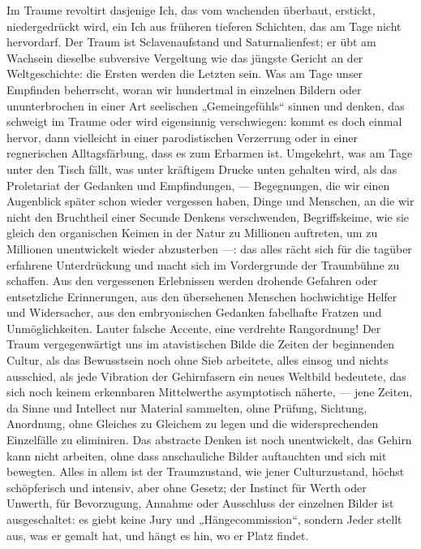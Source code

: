Im Traume revoltirt dasjenige Ich, das vom wachenden überbaut, erstickt, niedergedrückt wird, ein Ich aus früheren tieferen Schichten, das am Tage nicht hervordarf. Der Traum ist Sclavenaufstand und Saturnalienfest; er übt am Wachsein dieselbe subversive Vergeltung wie das jüngste Gericht an der Weltgeschichte: die Ersten werden die Letzten sein. Was am Tage unser Empfinden beherrscht, woran wir hundertmal in einzelnen Bildern oder ununterbrochen in einer Art seelischen „Gemeingefühls“ sinnen und denken, das schweigt im Traume oder wird eigensinnig verschwiegen: kommt es doch einmal hervor, dann vielleicht in einer parodistischen Verzerrung oder in einer regnerischen Alltagsfärbung, dass es zum Erbarmen ist. Umgekehrt, was am Tage unter den Tisch fällt, was unter kräftigem Drucke unten gehalten wird, als das Proletariat der Gedanken und Empfindungen, — Begegnungen, die wir einen Augenblick später schon wieder vergessen haben, Dinge und Menschen, an die wir nicht den Bruchtheil einer Secunde Denkens verschwenden, Begriffskeime, wie sie gleich den organischen Keimen in der Natur zu Millionen auftreten, um zu Millionen unentwickelt wieder abzusterben —: das alles rächt sich für die tagüber erfahrene Unterdrückung und macht sich im Vordergrunde der Traumbühne zu schaffen. Aus den vergessenen Erlebnissen werden drohende Gefahren oder entsetzliche Erinnerungen, aus den übersehenen Menschen hochwichtige Helfer und Widersacher, aus den embryonischen Gedanken fabelhafte Fratzen und Unmöglichkeiten. Lauter falsche Accente, eine verdrehte Rangordnung! Der Traum vergegenwärtigt uns im atavistischen Bilde die Zeiten der beginnenden Cultur, als das Bewusstsein noch ohne Sieb arbeitete, alles einsog und nichts ausschied, als jede Vibration der Gehirnfasern ein neues Weltbild bedeutete, das sich noch keinem erkennbaren Mittelwerthe asymptotisch näherte, — jene Zeiten, da Sinne und Intellect nur Material sammelten, ohne Prüfung, Sichtung, Anordnung, ohne Gleiches zu Gleichem zu legen und die widersprechenden Einzelfälle zu eliminiren. Das abstracte Denken ist noch unentwickelt, das Gehirn kann nicht arbeiten, ohne dass anschauliche Bilder auftauchten und sich mit bewegten. Alles in allem ist der Traumzustand, wie jener Culturzustand, höchst schöpferisch und intensiv, aber ohne Gesetz; der Instinct für Werth oder Unwerth, für Bevorzugung, Annahme oder Ausschluss der einzelnen Bilder ist ausgeschaltet: es giebt keine Jury und „Hängecommission“, sondern Jeder stellt aus, was er gemalt hat, und hängt es hin, wo er Platz findet.
\par

